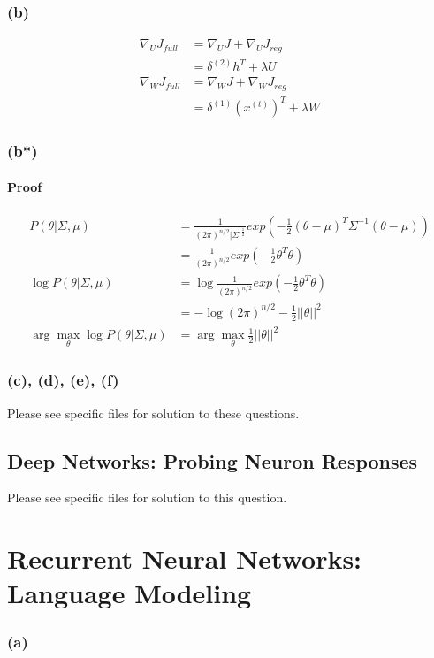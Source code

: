 \documentclass{article}
\begin{document}
\subsubsection*{(b)}
\begin{align}
\nabla_U J_{full} 
&= \nabla_U J + \nabla_U J_{reg} \\
&= \delta^{(2)}h^T + \lambda U \\
\nabla_W J_{full} 
&= \nabla_W J + \nabla_W J_{reg} \\
&= \delta^{(1)}(x^{(t)})^T + \lambda W 
\end{align}
\subsubsection*{(b*)}
\paragraph{Proof}
\begin{align*}
P(\theta|\Sigma, \mu) 
&= \frac{1}{(2\pi)^{n/2}|\Sigma|^{\frac{1}{2}}}exp(-\frac{1}{2}(\theta-\mu)^T \Sigma^{-1}(\theta-\mu)) \\
&=  \frac{1}{(2\pi)^{n/2}}exp(-\frac{1}{2}\theta^T\theta{}) \\
\log P(\theta|\Sigma, \mu) 
&= \log \frac{1}{(2\pi)^{n/2}}exp(-\frac{1}{2}\theta^T\theta) \\
&= -\log (2\pi)^{n/2} -\frac{1}{2}||\theta||^2 \\
\arg\max_\theta \log P(\theta|\Sigma, \mu) 
&= \arg\max_\theta \frac{1}{2} ||\theta||^2 
\end{align*}

\subsubsection*{(c), (d), (e), (f)}
Please see specific files for solution to these questions.\\


\subsection{Deep Networks: Probing Neuron Responses}
Please see specific files for solution to this question.\\

\section{Recurrent Neural Networks: Language Modeling}	
\subsubsection*{(a)}
\end{document}
